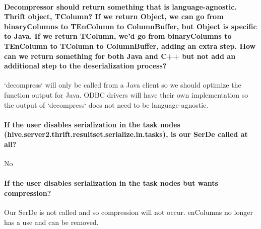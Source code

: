 \documentclass[11pt,a4paper]{article}
\begin{document}
	\paragraph{Decompressor should return something that is language-agnostic. Thrift object, TColumn? If we return Object, we can go from binaryColumns to TEnColumn to ColumnBuffer, but Object is specific to Java. If we return TColumn, we'd go from binaryColumns to TEnColumn to TColumn to ColumnBuffer, adding an extra step. How can we return something for both Java and C++ but not add an additional step to the deserialization process?}
	`decompress` will only be called from a Java client so we should optimize the function output for Java. ODBC drivers will have their own implementation so the output of `decompress` does not need to be language-agnostic.
	
	\paragraph{If the user disables serialization in the task nodes \linebreak (hive.server2.thrift.resultset.serialize.in.tasks), is our SerDe called at all?}
	No
	
	\paragraph{If the user disables serialization in the task nodes but wants compression?}
	Our SerDe is not called and so compression will not occur. enColumns no longer has a use and can be removed.
\end{document}
